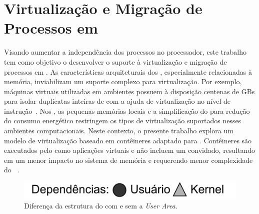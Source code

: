 \glsresetall

\chapter{Virtualização e Migração de Processos em \Lws}
\label{chap.dev.virtualizacao}

Visando aumentar a independência dos processos no processador, este trabalho tem como objetivo o desenvolver o suporte à virtualização e migração de processos em \lws. As características arquiteturais dos \lws, especialmente relacionadas à memória, inviabilizam um suporte complexo para virtualização. Por exemplo, máquinas virtuais utilizadas em ambientes \cloud possuem à disposição centenas de GBs para isolar duplicatas inteiras de \oss com a ajuda de virtualização no nível de instrução~\cite{sharma2016containers}. Nos \lws, as pequenas memórias locais e a simplificação do \hardware para redução do consumo energético restringem os tipos de virtualização suportados nesses ambientes computacionais.
%
Neste contexto, o presente trabalho explora um modelo de virtualização baseado em contêineres adaptado para \lws. Contêineres são executados pelo \os como aplicações virtuais e não incluem um \os convidado, resultando em um menor impacto no sistema de memória e requerendo menor complexidade do \hardware~\cite{thalheim2018cntr, sharma2016containers}.


\begin{figure}[t]
    \centering%

    \includegraphics[width=.3\linewidth]{content/images/legenda.pdf}%

    \vspace{-2mm}%

    \quad\quad%
    \caption{Diferença da estrutura do \nanvix com e sem a \textit{User Area}.}%
\end{figure}

